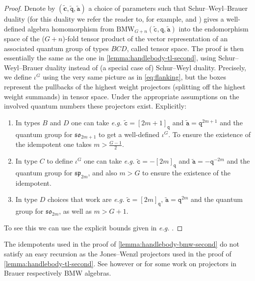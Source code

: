 \documentclass[a4paper,11pt]{amsart}
\newcommand{\eg}{\textsl{e.g.}}
\newcommand{\setstuff}[1]{\mathrm{#1}}
\newcommand{\bsym}[1]{\boldsymbol{#1}}
\newcommand{\varsym}[1]{\mathtt{#1}}
\newcommand{\qvar}{\varsym{q}}
\newcommand{\cpar}{\bsym{c}}
\newcommand{\cvar}{\varsym{c}}
\newcommand{\avar}{\varsym{a}}
\numberwithin{equation}{section}
\let\fullref\autoref
\begin{document}
\begin{proof}
Denote by $(\tilde{\cpar},\tilde{\qvar},\tilde{\avar})$ 
a choice of parameters such that Schur--Weyl--Brauer duality 
(for this duality 
we refer the reader to, for example, \cite[Theorem 3.17]{AnStTu-semisimple-tilting} 
and \cite[Theorem 1.3]{Hu-bmw-typec})
gives a well-defined algebra homomorphism from 
$\setstuff{BMW}_{G+n}(\tilde{\cvar},\qvar,\tilde{\avar})$
into the endomorphism space of the ($G+n$)-fold 
tensor product of the vector representation of an associated quantum 
group of types $BCD$, called tensor space. 
The proof is then essentially the same as the one in 
\fullref{lemma:handlebody-tl-second}, using 
Schur--Weyl--Brauer duality instead of 
(a special case of) Schur--Weyl duality. Precisely, 
we define $\iota^{G}$ using the very same picture as in \eqref{eq:flanking}, 
but the boxes represent 
the pullbacks of the highest weight projectors 
(splitting off the highest weight summands) in tensor space. 
Under the appropriate 
assumptions on the involved quantum numbers these 
projectors exist. Explicitly:
\begin{enumerate}[label=$\bullet$]

\item In types $B$ and $D$ one can take {\eg} $\tilde{\cvar}=[2m+1]_{\qvar}$
and $\tilde{\avar}=\qvar^{2m+1}$ and the quantum group 
for $\mathfrak{so}_{2m+1}$ to get a well-defined 
$\iota^{G}$. To ensure the existence of the idempotent 
one takes $m>\tfrac{G-1}{2}$.

\item In type $C$ to define $\iota^{G}$ one 
can take {\eg} $\tilde{\cvar}=-[2m]_{\qvar}$
and $\tilde{\avar}=-\qvar^{-2m}$ and the quantum group 
for $\mathfrak{sp}_{2m}$, and also $m>G$ to ensure the existence of the idempotent.

\item In type $D$ choices that work are {\eg} $\tilde{\cvar}=[2m]_{\qvar}$,
$\tilde{\avar}=\qvar^{2m}$ and the quantum group 
for $\mathfrak{so}_{2m}$, as well as $m>G+1$.

\end{enumerate}
To see this we can use the explicit bounds given in 
{\eg} \cite[Theorem 3.17]{AnStTu-semisimple-tilting}.
\end{proof}

\begin{remark}
The idempotents used in the proof of 
\fullref{lemma:handlebody-bmw-second} do not satisfy 
an easy recursion as the Jones--Wenzl projectors used in 
the proof of \fullref{lemma:handlebody-tl-second}.
See however \cite{IsMoOg-bmw-idempotents} or \cite{LeZh-brauer-invariant-theory} 
for some work on projectors in Brauer respectively BMW algebras.
\end{remark}
\end{document}
